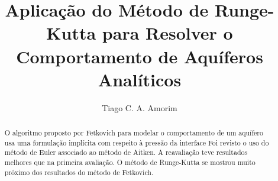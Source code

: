 \documentclass[final,5p]{elsarticle}
\numberwithin{equation}{section}
\begin{document}
\begin{frontmatter}



\title{Aplicação do Método de Runge-Kutta para Resolver o Comportamento de Aquíferos Analíticos}


\author{Tiago C. A. Amorim}

\begin{abstract}

    O algoritmo proposto por Fetkovich para modelar o comportamento de um aquífero usa uma formulação implícita com respeito à pressão da interface
    Foi revisto o uso do método de Euler associado ao método de Aitken. A reavaliação teve resultados melhores que na primeira avaliação. O método de Runge-Kutta se mostrou muito próximo dos resultados do método de Fetkovich.


\end{abstract}
\end{frontmatter}
\end{document}
